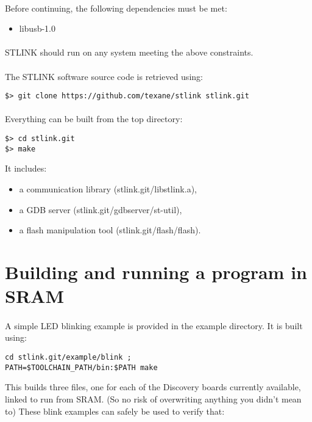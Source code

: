 \documentclass[a4paper, 11pt]{article}
\begin{document}
\paragraph{}
Before continuing, the following dependencies must be met:
\begin{itemize}
\item libusb-1.0
\end{itemize}

\paragraph{}
STLINK should run on any system meeting the above constraints.

\paragraph{}
The STLINK software source code is retrieved using:\\
\begin{small}
\begin{lstlisting}[frame=tb]
$> git clone https://github.com/texane/stlink stlink.git
\end{lstlisting}
\end{small}

\paragraph{}
Everything can be built from the top directory:\\
\begin{small}
\begin{lstlisting}[frame=tb]
$> cd stlink.git
$> make 
\end{lstlisting}
\end{small}
It includes:
\begin{itemize}
\item a communication library (stlink.git/libstlink.a),
\item a GDB server (stlink.git/gdbserver/st-util),
\item a flash manipulation tool (stlink.git/flash/flash).
\end{itemize}


\newpage
\section{Building and running a program in SRAM}
\paragraph{}
A simple LED blinking example is provided in the example directory. It is built using:\\
\begin{small}
\begin{lstlisting}[frame=tb]
cd stlink.git/example/blink ;
PATH=$TOOLCHAIN_PATH/bin:$PATH make
\end{lstlisting}
\end{small}
This builds three files, one for each of the Discovery boards currently
available, linked to run from SRAM. (So no risk of overwriting anything you didn't mean to) 
These blink examples can safely be used to verify that:
\end{document}

